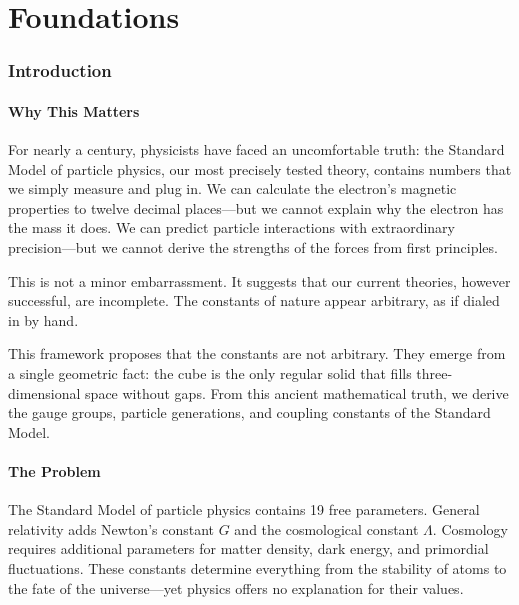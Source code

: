 \documentclass[11pt,a4paper]{article}
\theoremstyle{plain}
\theoremstyle{definition}
\theoremstyle{remark}
\begin{document}
\tableofcontents
\newpage

\part{Foundations}

\section{Introduction}

\subsection{Why This Matters}

For nearly a century, physicists have faced an uncomfortable truth: the Standard Model of particle physics, our most precisely tested theory, contains numbers that we simply measure and plug in. We can calculate the electron's magnetic properties to twelve decimal places---but we cannot explain why the electron has the mass it does. We can predict particle interactions with extraordinary precision---but we cannot derive the strengths of the forces from first principles.

This is not a minor embarrassment. It suggests that our current theories, however successful, are incomplete. The constants of nature appear arbitrary, as if dialed in by hand.

This framework proposes that the constants are not arbitrary. They emerge from a single geometric fact: the cube is the only regular solid that fills three-dimensional space without gaps. From this ancient mathematical truth, we derive the gauge groups, particle generations, and coupling constants of the Standard Model.

\subsection{The Problem}

The Standard Model of particle physics contains 19 free parameters. General relativity adds Newton's constant $G$ and the cosmological constant $\Lambda$. Cosmology requires additional parameters for matter density, dark energy, and primordial fluctuations. These constants determine everything from the stability of atoms to the fate of the universe---yet physics offers no explanation for their values.
\end{document}
